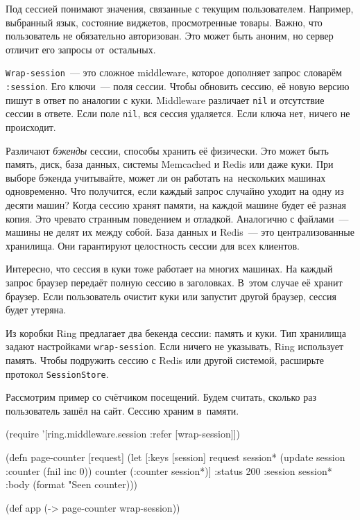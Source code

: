 Под сессией понимают значения, связанные с текущим пользователем. Например,
выбранный язык, состояние виджетов, просмотренные товары. Важно, что
пользователь не обязательно авторизован. Это может быть аноним, но сервер
отличит его запросы от~остальных.


\verb|Wrap-session|~--- это сложное middleware, которое дополняет запрос словарём
\verb|:session|. Его ключи~--- поля сессии. Чтобы обновить сессию, её новую
версию пишут в ответ по аналогии с куки. Middleware различает \verb|nil| и
отсутствие сессии в ответе. Если поле \verb|nil|, вся сессия удаляется. Если
ключа нет, ничего не происходит.


Различают \emph{бэкенды} сессии, способы хранить её физически. Это может
быть память, диск, база данных, системы Memcached и Redis или даже куки. При
выборе бэкенда учитывайте, может ли он работать на~нескольких машинах
одновременно. Что получится, если каждый запрос случайно уходит на одну из
десяти машин? Когда сессию хранят памяти, на каждой машине будет её разная
копия. Это чревато странным поведением и отладкой. Аналогично с файлами~---
машины не делят их между собой. База данных и Redis~--- это централизованные
хранилища. Они гарантируют целостность сессии для всех клиентов.

Интересно, что сессия в куки тоже работает на многих машинах. На каждый запрос
браузер передаёт полную сессию в заголовках. В~этом случае её хранит
браузер. Если пользователь очистит куки или запустит другой браузер, сессия
будет утеряна.

Из коробки Ring предлагает два бекенда сессии: память и куки. Тип хранилища
задают настройками \verb|wrap-session|. Если ничего не указывать, Ring
использует память. Чтобы подружить сессию с Redis или другой системой, расширьте
протокол \verb|SessionStore|.

Рассмотрим пример со счётчиком посещений. Будем считать, сколько раз
пользователь зашёл на сайт. Сессию храним в~памяти.


\ifx\DEVICETYPE\MOBILE

\begin{english}
  \begin{clojure}
(require '[ring.middleware.session
           :refer [wrap-session]])

(defn page-counter [request]
  (let [{:keys [session]} request
        session* (update session
                   :counter (fnil inc 0))
        counter (:counter session*)]
    {:status 200
     :session session*
     :body (format "Seen %
                   counter)}))

(def app (-> page-counter
             wrap-session))
  \end{clojure}
\end{english}

